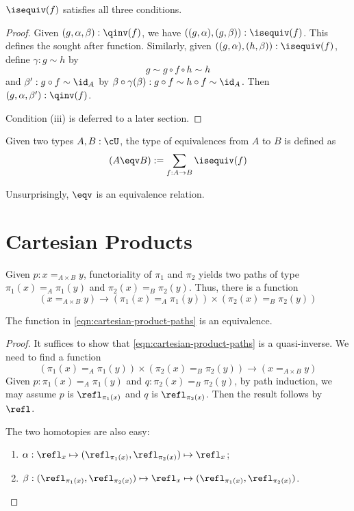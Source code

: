 \documentclass{amsart}
\begin{document}
\begin{lem}
  $\isequiv(f)$ satisfies all three conditions.
\end{lem}
\begin{proof}
  Given $(g,\alpha,\beta) : \qinv(f)$, we have $((g,\alpha),(g,\beta)) : \isequiv(f)$.
  This defines the sought after function.
  Similarly, given $((g,\alpha),(h,\beta)) : \isequiv(f)$, define $\gamma : g \sim h$ by
  \[
    g \sim g \circ f \circ h \sim h
  \]
  and $\beta' : g \circ f \sim \id_{A}$ by $\beta \circ \gamma(\beta) : g \circ f \sim h \circ f \sim \id_{A}$.
  Then $(g,\alpha,\beta') : \qinv(f)$.

  Condition (iii) is deferred to a later section.
\end{proof}

\begin{defn}
  Given two types $A, B : \cU$, the type of equivalences from $A$ to $B$ is defined as
  \[
    (A \eqv B) := \sum_{f : A \to B}\isequiv(f)
  \]
\end{defn}
Unsurprisingly, $\eqv$ is an equivalence relation.

\section{Cartesian Products}
\label{sec:cartesian-products}

Given $p : x =_{A \times B} y$, functoriality of $\pi_{1}$ and $\pi_{2}$ yields two paths of type $\pi_{1}(x) =_{A} \pi_{1}(y)$ and $\pi_{2}(x) =_{B} \pi_{2}(y)$.
Thus, there is a function
\begin{equation}\label{eqn:cartesian-product-paths}
  (x =_{A \times B} y) \to (\pi_{1}(x) =_{A} \pi_{1}(y)) \times (\pi_{2}(x) =_{B} \pi_{2}(y))
\end{equation}

\begin{lem}
  The function in \eqref{eqn:cartesian-product-paths} is an equivalence.
\end{lem}
\begin{proof}
  It suffices to show that \eqref{eqn:cartesian-product-paths} is a quasi-inverse.
  We need to find a function
  \[
    (\pi_{1}(x) =_{A} \pi_{1}(y)) \times (\pi_{2}(x) =_{B} \pi_{2}(y)) \to (x =_{A \times B} y)
  \]
  Given $p : \pi_{1}(x) =_{A} \pi_{1}(y)$ and $q : \pi_{2}(x) =_{B} \pi_{2}(y)$, by path induction, we may assume $p$ is $\refl_{\pi_{1}(x)}$ and $q$ is $\refl_{\pi_{2}(x)}$.
  Then the result follows by $\refl$.

  The two homotopies are also easy:
  \begin{enumerate}
  \item $\alpha : \refl_{x} \mapsto (\refl_{\pi_{1}(x)},\refl_{\pi_{2}(x)}) \mapsto \refl_{x}$;
  \item $\beta : (\refl_{\pi_{1}(x)},\refl_{\pi_{2}(x)}) \mapsto \refl_{x} \mapsto (\refl_{\pi_{1}(x)},\refl_{\pi_{2}(x)})$.
  \end{enumerate}
\end{proof}



\end{document}
